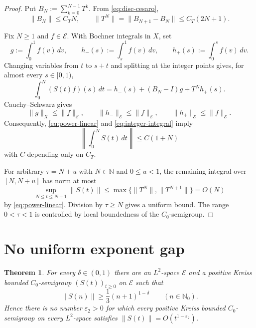 \documentclass[11pt]{article}
\newtheorem{theorem}{Theorem}
\newcommand{\N}{\mathbb N}
\newcommand{\E}{\mathcal E}
\begin{document}
\begin{proof}
Put $B_N:=\sum_{k=0}^{N-1}T^k$.  From \eqref{eq:disc-cesaro},
\begin{equation}\label{eq:power-linear}
  \|B_N\|\leq C_TN,
  \qquad
  \|T^N\|=\|B_{N+1}-B_N\|\leq C_T(2N+1).
\end{equation}

Fix $N\geq1$ and $f\in\E$.  With Bochner integrals in $X$, set
\[
  g:=\int_0^1f(v)\,dv,
  \qquad h_-(s):=\int_s^1f(v)\,dv,
  \qquad h_+(s):=\int_0^sf(v)\,dv.
\]
Changing variables from $t$ to $s+t$ and splitting at the integer points gives,
for almost every $s\in[0,1)$,
\begin{equation}\label{eq:integer-integral}
  \int_0^N(S(t)f)(s)\,dt
  =h_-(s)+(B_N-I)g+T^Nh_+(s).
\end{equation}
Cauchy--Schwarz gives
\[
  \|g\|_X\leq\|f\|_{\E},
  \qquad \|h_-\|_{\E}\leq\|f\|_{\E},
  \qquad \|h_+\|_{\E}\leq\|f\|_{\E}.
\]
Consequently, \eqref{eq:power-linear} and \eqref{eq:integer-integral} imply
\[
  \left\|\int_0^NS(t)\,dt\right\|\leq C(1+N)
\]
with $C$ depending only on $C_T$.

For arbitrary $\tau=N+u$ with $N\in\N$ and $0\leq u<1$, the remaining
integral over $[N,N+u]$ has norm at most
\[
  \sup_{N\leq t\leq N+1}\|S(t)\|
  \leq\max\{\|T^N\|,\|T^{N+1}\|\}=O(N)
\]
by \eqref{eq:power-linear}.  Division by $\tau\geq N$ gives a uniform bound.
The range $0<\tau<1$ is controlled by local boundedness of the $C_0$-semigroup.
\end{proof}

\section{No uniform exponent gap}

\begin{theorem}\label{thm:main}
For every $\delta\in(0,1)$ there are an $L^2$-space $\E$ and a positive Kreiss
bounded $C_0$-semigroup $(S(t))_{t\geq0}$ on $\E$ such that
\begin{equation}\label{eq:lower}
  \|S(n)\|\geq\frac13(n+1)^{1-\delta}
  \qquad(n\in\N_0).
\end{equation}
Hence there is no number $\varepsilon_2>0$ for which every positive Kreiss
bounded $C_0$-semigroup on every $L^2$-space satisfies
$\|S(t)\|=O(t^{1-\varepsilon_2})$.
\end{theorem}
\end{document}
